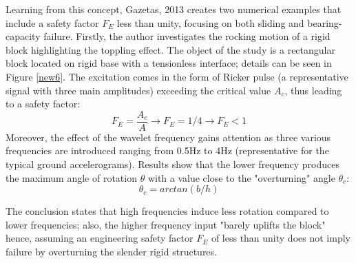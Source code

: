 \documentclass[12pt,a4paper]{report}
\begin{document}
 Learning from this concept, Gazetas, 2013 \cite{gazetas2013can} creates two numerical examples that include a safety factor $F_E$ less than unity, focusing on both sliding and bearing-capacity failure.
Firstly, the author investigates the rocking motion of a rigid block highlighting the toppling effect. The object of the study is a rectangular block located on rigid base with a tensionless interface; details can be seen in Figure \ref{new6}. The excitation comes in the form of Ricker pulse (a representative signal with three main amplitudes) exceeding the critical value $A_c$, thus leading to a safety factor:
 \begin{equation}
 F_E= \frac{A_c}{A} \longrightarrow F_E=1/4 \longrightarrow F_E<1
 \end{equation}
 Moreover, the effect of the wavelet frequency gains attention as three various frequencies are introduced ranging from 0.5Hz to 4Hz (representative for the typical ground accelerograms). Results show that the lower frequency produces the maximum angle of rotation $\theta$ with a value close to the "overturning" angle $\theta_c$:
 \begin{equation}
 	\theta_c=arctan(b/h)
 \end{equation}
 
 The conclusion states that high frequencies induce less rotation compared to lower frequencies; also, the higher frequency input "barely uplifts the block" hence, assuming an engineering safety factor $F_E$ of less than unity does not imply failure by overturning the slender rigid structures.
  
\end{document}
